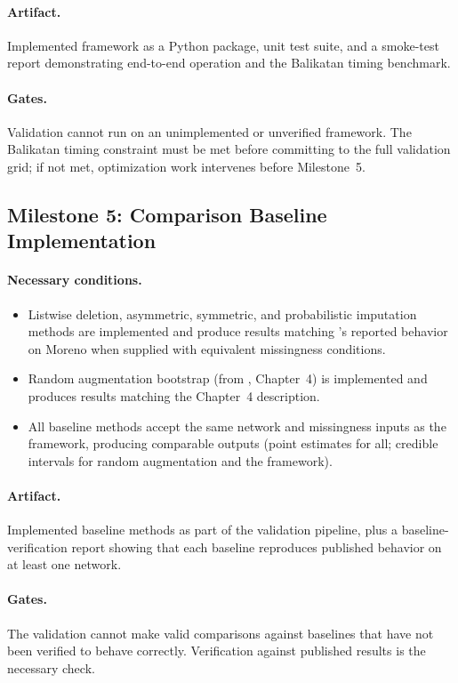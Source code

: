 \documentclass[11pt]{article}
\begin{document}
\paragraph{Artifact.} Implemented framework as a Python package, unit test suite, and a smoke-test report demonstrating end-to-end operation and the Balikatan timing benchmark.

\paragraph{Gates.} Validation cannot run on an unimplemented or unverified framework. The Balikatan timing constraint must be met before committing to the full validation grid; if not met, optimization work intervenes before Milestone~5.

\subsection*{Milestone 5: Comparison Baseline Implementation}

\paragraph{Necessary conditions.}
\begin{itemize}[leftmargin=*, itemsep=2pt]
  \item Listwise deletion, asymmetric, symmetric, and probabilistic imputation methods are implemented and produce results matching \citet{SmithMorganMoody2022}'s reported behavior on Moreno when supplied with equivalent missingness conditions.
  \item Random augmentation bootstrap (from \citet{Bellutta2026}, Chapter~4) is implemented and produces results matching the Chapter~4 description.
  \item All baseline methods accept the same network and missingness inputs as the framework, producing comparable outputs (point estimates for all; credible intervals for random augmentation and the framework).
\end{itemize}

\paragraph{Artifact.} Implemented baseline methods as part of the validation pipeline, plus a baseline-verification report showing that each baseline reproduces published behavior on at least one network.

\paragraph{Gates.} The validation cannot make valid comparisons against baselines that have not been verified to behave correctly. Verification against published results is the necessary check.
\end{document}
